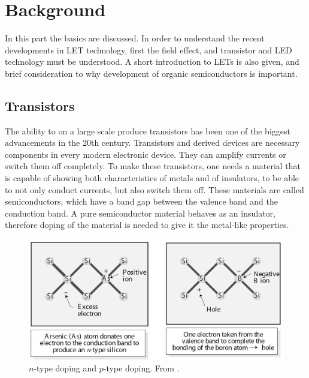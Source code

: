 \section{Background}
% 
In this part the basics are discussed. In order to understand the recent developments in LET technology, first the field effect, and transistor and LED technology must be understood. A short introduction to LETs is also given, and brief consideration to why development of organic semiconductors is important.
 
\subsection{Transistors}

The ability to on a large scale produce transistors has been one of the biggest advancements in the 20th century. Transistors and derived devices are necessary components in every modern electronic device. They can amplify currents or switch them off completely. To make these transistors, one needs a material that is capable of showing both characteristics of metals and of insulators, to be able to not only conduct currents, but also switch them off. These materials are called semiconductors, which have a band gap between the valence band and the conduction band. A pure semiconductor material behaves as an insulator, therefore doping of the material is needed to give it the metal-like properties.

\begin{figure}[!ht]
 \begin{center}
  \includegraphics[width=1\textwidth]{doping}
  \caption{$n$-type doping and $p$-type doping. From \citet{vanweesbook}.}
  \label{fig:doping}
 \end{center}
\end{figure}

